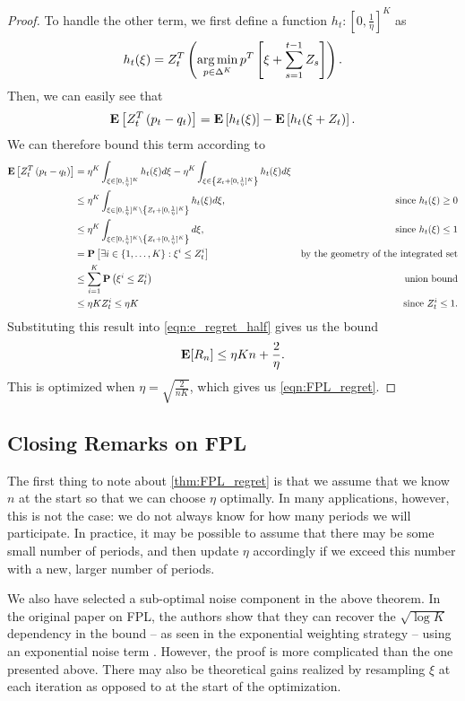 \begin{theorem}
\begin{proof}
To handle the other term, we first define a function $h_t : [0, \frac{1}{\eta}]^K$ as
\[
h_t(\xi) = Z_t^T \left(\operatorname*{arg\,min}_{p \in \Delta^K} p^T \left[\xi + \sum_{s=1}^{t-1} Z_s \right] \right).
\]
Then, we can easily see that
\[
\mathbf{E}\left[Z_t^T \left(p_t - q_t\right) \right] = \mathbf{E}\left[h_t(\xi)\right] -  \mathbf{E}\left[h_t(\xi + Z_t)\right].
\]
We can therefore bound this term according to
\begin{align*}
\mathbf{E}\left[Z_t^T \left(p_t - q_t\right) \right] &= \eta^K \int_{\xi \in [0, \frac{1}{\eta}]^K} h_t(\xi)d\xi - \eta^K \int_{\xi \in \left\{Z_t + [0, \frac{1}{\eta}]^K\right\}} h_t(\xi)d\xi \\
&\leq \eta^K \int_{\xi \in [0, \frac{1}{\eta}]^K \setminus \left\{Z_t + [0, \frac{1}{\eta}]^K\right\}} h_t(\xi)d\xi, &\text{since $h_t(\xi) \geq 0$} \\
&\leq \eta^K \int_{\xi \in [0, \frac{1}{\eta}]^K \setminus \left\{Z_t + [0, \frac{1}{\eta}]^K\right\}} d\xi, &\text{since $h_t(\xi) \leq 1$} \\
&= \mathbf{P}\left[\exists i \in \{1, \ldots, K\} : \xi^i \leq Z_t^i\right] &\text{by the geometry of the integrated set}\\
&\leq \sum_{i=1}^K \mathbf{P}\left(\xi^i \leq Z_t^i\right) &\text{union bound} \\
&\leq \eta K Z_t^i \leq \eta K &\text{since $Z_t^i \leq 1$}.
\end{align*}
Substituting this result into \eqref{eqn:e_regret_half} gives us the bound
\[
\mathbf{E}[R_n] \leq \eta K n + \frac{2}{\eta}.
\]
This is optimized when $\eta = \sqrt{\frac{2}{nK}}$, which gives us \eqref{eqn:FPL_regret}.
\end{proof}
\end{theorem}

\subsection{Closing Remarks on FPL}
The first thing to note about \autoref{thm:FPL_regret} is that we assume that we know $n$ at the start so that we can choose $\eta$ optimally. In many applications, however, this is not the case: we do not always know for how many periods we will participate. In practice, it may be possible to assume that there may be some small number of periods, and then update $\eta$ accordingly if we exceed this number with a new, larger number of periods.

We also have selected a sub-optimal noise component in the above theorem. In the original paper on FPL, the authors show that they can recover the $\sqrt{\log K}$ dependency in the bound -- as seen in the exponential weighting strategy -- using an exponential noise term \cite{kalai2005efficient}. However, the proof is more complicated than the one presented above. There may also be theoretical gains realized by resampling $\xi$ at each iteration as opposed to at the start of the optimization.

